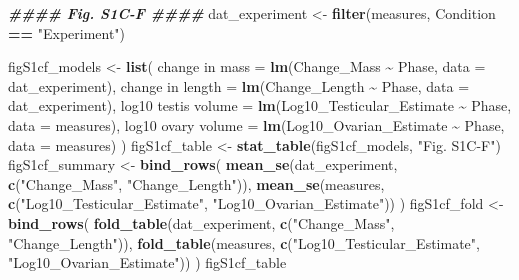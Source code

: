 \documentclass[
  landscape]{article}
\newenvironment{Shaded}{\begin{snugshade}}{\end{snugshade}}
\newcommand{\AttributeTok}[1]{\textcolor[rgb]{0.13,0.29,0.53}{#1}}
\newcommand{\DocumentationTok}[1]{\textcolor[rgb]{0.56,0.35,0.01}{\textbf{\textit{#1}}}}
\newcommand{\FunctionTok}[1]{\textcolor[rgb]{0.13,0.29,0.53}{\textbf{#1}}}
\newcommand{\NormalTok}[1]{#1}
\newcommand{\OtherTok}[1]{\textcolor[rgb]{0.56,0.35,0.01}{#1}}
\newcommand{\SpecialCharTok}[1]{\textcolor[rgb]{0.81,0.36,0.00}{\textbf{#1}}}
\newcommand{\StringTok}[1]{\textcolor[rgb]{0.31,0.60,0.02}{#1}}
\begin{document}
\begin{Shaded}
\begin{Highlighting}[]
\DocumentationTok{\#\#\#\# Fig. S1C{-}F \#\#\#\#}
\NormalTok{dat\_experiment }\OtherTok{\textless{}{-}} \FunctionTok{filter}\NormalTok{(measures, Condition }\SpecialCharTok{==} \StringTok{"Experiment"}\NormalTok{)}

\NormalTok{figS1cf\_models }\OtherTok{\textless{}{-}} \FunctionTok{list}\NormalTok{(}
  \StringTok{\textasciigrave{}}\AttributeTok{change in mass}\StringTok{\textasciigrave{}}      \OtherTok{=} \FunctionTok{lm}\NormalTok{(Change\_Mass }\SpecialCharTok{\textasciitilde{}}\NormalTok{ Phase, }\AttributeTok{data =}\NormalTok{ dat\_experiment),}
  \StringTok{\textasciigrave{}}\AttributeTok{change in length}\StringTok{\textasciigrave{}}    \OtherTok{=} \FunctionTok{lm}\NormalTok{(Change\_Length }\SpecialCharTok{\textasciitilde{}}\NormalTok{ Phase, }\AttributeTok{data =}\NormalTok{ dat\_experiment),}
  \StringTok{\textasciigrave{}}\AttributeTok{log10 testis volume}\StringTok{\textasciigrave{}} \OtherTok{=} \FunctionTok{lm}\NormalTok{(Log10\_Testicular\_Estimate }\SpecialCharTok{\textasciitilde{}}\NormalTok{ Phase, }\AttributeTok{data =}\NormalTok{ measures),}
  \StringTok{\textasciigrave{}}\AttributeTok{log10 ovary volume}\StringTok{\textasciigrave{}}  \OtherTok{=} \FunctionTok{lm}\NormalTok{(Log10\_Ovarian\_Estimate }\SpecialCharTok{\textasciitilde{}}\NormalTok{ Phase, }\AttributeTok{data =}\NormalTok{ measures)}
\NormalTok{)}
\NormalTok{figS1cf\_table }\OtherTok{\textless{}{-}} \FunctionTok{stat\_table}\NormalTok{(figS1cf\_models, }\StringTok{"Fig. S1C{-}F"}\NormalTok{)}
\NormalTok{figS1cf\_summary }\OtherTok{\textless{}{-}} \FunctionTok{bind\_rows}\NormalTok{(}
  \FunctionTok{mean\_se}\NormalTok{(dat\_experiment, }\FunctionTok{c}\NormalTok{(}\StringTok{"Change\_Mass"}\NormalTok{, }\StringTok{"Change\_Length"}\NormalTok{)),}
  \FunctionTok{mean\_se}\NormalTok{(measures, }\FunctionTok{c}\NormalTok{(}\StringTok{"Log10\_Testicular\_Estimate"}\NormalTok{, }\StringTok{"Log10\_Ovarian\_Estimate"}\NormalTok{))}
\NormalTok{)}
\NormalTok{figS1cf\_fold }\OtherTok{\textless{}{-}} \FunctionTok{bind\_rows}\NormalTok{(}
  \FunctionTok{fold\_table}\NormalTok{(dat\_experiment, }\FunctionTok{c}\NormalTok{(}\StringTok{"Change\_Mass"}\NormalTok{, }\StringTok{"Change\_Length"}\NormalTok{)),}
  \FunctionTok{fold\_table}\NormalTok{(measures, }\FunctionTok{c}\NormalTok{(}\StringTok{"Log10\_Testicular\_Estimate"}\NormalTok{, }\StringTok{"Log10\_Ovarian\_Estimate"}\NormalTok{))}
\NormalTok{)}
\NormalTok{figS1cf\_table}
\end{Highlighting}
\end{Shaded}
\end{document}
